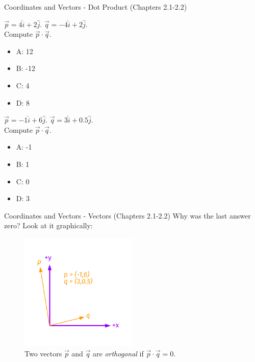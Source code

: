 \documentclass{beamer}
\begin{document}
\begin{frame}{Coordinates and Vectors - Dot Product (Chapters 2.1-2.2)}
\small
\begin{minipage}[b]{0.45\linewidth}
$\vec{p} = 4\hat{i}+2\hat{j}$.  $\vec{q} = -4\hat{i}+2\hat{j}$.  \\
Compute $\vec{p} \cdot \vec{q}$.
\vspace{0.2cm}
\begin{itemize}
\item A: 12
\item B: -12
\item C: 4
\item D: 8
\end{itemize}
\end{minipage}
\hspace{0.5cm}
\begin{minipage}[b]{0.45\linewidth}
$\vec{p} = -1\hat{i}+6\hat{j}$.  $\vec{q} = 3\hat{i}+0.5\hat{j}$.  \\
Compute $\vec{p} \cdot \vec{q}$.
\vspace{0.2cm}
\begin{itemize}
\item A: -1
\item B: 1
\item C: 0
\item D: 3
\end{itemize}
\end{minipage}
\end{frame}

\begin{frame}{Coordinates and Vectors - Vectors (Chapters 2.1-2.2)}
Why was the last answer zero?  Look at it graphically:
\begin{figure}
\centering
\includegraphics[width=0.5\textwidth,trim=1cm 1cm 1cm 1cm,clip=true]{figures/Vectors5.pdf}
\caption{\label{fig:twovectors4} Two vectors $\vec{p}$ and $\vec{q}$ are \textit{orthogonal} if $\vec{p} \cdot \vec{q} = 0$.}
\end{figure}
\end{frame}
\end{document}
